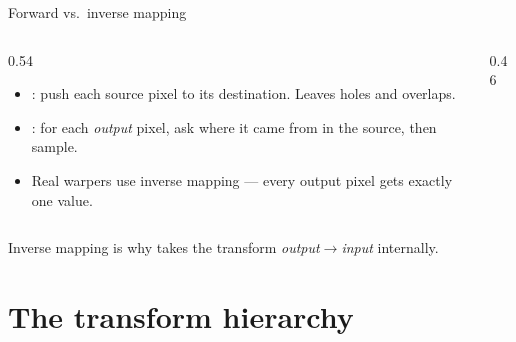 \documentclass[10pt,aspectratio=169]{beamer}
\begin{document}
\begin{frame}{Forward vs.\ inverse mapping}
  \begin{columns}[T]
    \begin{column}{0.54\textwidth}
      \begin{itemize}
        \item {}: push each source pixel to its destination. Leaves holes and overlaps.
        \item {}: for each \emph{output} pixel, ask where it came from in the source, then sample.
        \item Real warpers use inverse mapping — every output pixel gets exactly one value.
      \end{itemize}
    \end{column}
    \begin{column}{0.46\textwidth}
      \begin{center}
      \end{center}
    \end{column}
  \end{columns}
  \begin{infobox}
    Inverse mapping is why  takes the transform \emph{output$\to$input} internally.
  \end{infobox}
\end{frame}

\section{The transform hierarchy}
\end{document}
